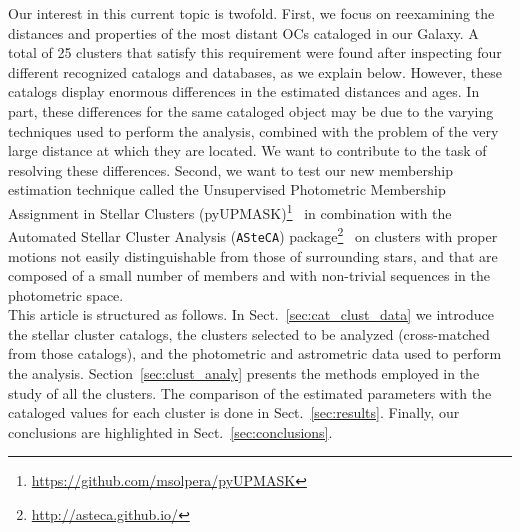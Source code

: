 \documentclass{aa}
\begin{document}
 Our interest in this current topic is twofold. First, we   focus
 on reexamining the distances and properties of the most distant OCs cataloged
   in our Galaxy. A total of 25 clusters that satisfy this requirement were
 found after inspecting four different recognized catalogs and databases, as we 
 explain below.
 However, these catalogs display enormous differences in the estimated distances
 and ages. In part, these differences for the same cataloged object may be due
 to the varying techniques used to perform the analysis, combined with
 the problem of the very large distance at which they are located.
 We want to contribute to the task of resolving these differences.
 Second, we want to test our new membership estimation technique called the Unsupervised Photometric Membership Assignment in Stellar Clusters
 (pyUPMASK)\footnote{\url{https://github.com/msolpera/pyUPMASK}}~\citep{Pera_2021}
 in combination with the Automated Stellar Cluster Analysis (\texttt{ASteCA}) package\footnote{\url{http://asteca.github.io/}}~\citep{Perren_2015}
 on clusters with proper motions  not easily distinguishable from those
 of surrounding stars, and that are composed of a small number of members and with
 non-trivial sequences in the photometric space.\\


 This article is structured as follows. In Sect.~\ref{sec:cat_clust_data} we
 introduce the stellar cluster catalogs, the clusters selected to be
 analyzed (cross-matched from those catalogs), and the photometric and
 astrometric data used to perform the analysis.
 Section~\ref{sec:clust_analy} presents the methods employed in the study of all the
 clusters. The comparison of the estimated parameters with the cataloged
 values for each cluster is done in Sect.~\ref{sec:results}. Finally,
 our conclusions are highlighted in Sect.~\ref{sec:conclusions}.
\end{document}
